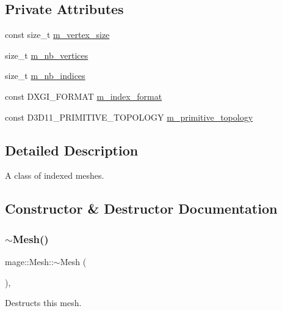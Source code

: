 \subsection*{Private Attributes}
\begin{DoxyCompactItemize}
\item 
const size\+\_\+t \hyperlink{classmage_1_1_mesh_ab3ebdfffca054f32ac69e47c486d57b1}{m\+\_\+vertex\+\_\+size}
\item 
size\+\_\+t \hyperlink{classmage_1_1_mesh_a5a04aa73e98c75dd5b8929296c3af9bb}{m\+\_\+nb\+\_\+vertices}
\item 
size\+\_\+t \hyperlink{classmage_1_1_mesh_a5e3baa9e2b2e9b4ce795a456f76d87b2}{m\+\_\+nb\+\_\+indices}
\item 
const D\+X\+G\+I\+\_\+\+F\+O\+R\+M\+AT \hyperlink{classmage_1_1_mesh_a93dbb92d756948df3b08fc29426c6acf}{m\+\_\+index\+\_\+format}
\item 
const D3\+D11\+\_\+\+P\+R\+I\+M\+I\+T\+I\+V\+E\+\_\+\+T\+O\+P\+O\+L\+O\+GY \hyperlink{classmage_1_1_mesh_a329fab0ad24e11b73a8981c6d09a0c7c}{m\+\_\+primitive\+\_\+topology}
\end{DoxyCompactItemize}


\subsection{Detailed Description}
A class of indexed meshes. 

\subsection{Constructor \& Destructor Documentation}
\hypertarget{classmage_1_1_mesh_afa39b90805e434cabb0989878e335b9e}{}\label{classmage_1_1_mesh_afa39b90805e434cabb0989878e335b9e} 
\subsubsection{\texorpdfstring{$\sim$\+Mesh()}{~Mesh()}}
{\footnotesize\ttfamily mage\+::\+Mesh\+::$\sim$\+Mesh (\begin{DoxyParamCaption}{ }\end{DoxyParamCaption})\hspace{0.3cm}{\ttfamily [virtual]}, {\ttfamily [default]}}

Destructs this mesh. \hypertarget{classmage_1_1_mesh_a1e61f6254fab6af510d40c437bc2922b}{}\label{classmage_1_1_mesh_a1e61f6254fab6af510d40c437bc2922b} 
